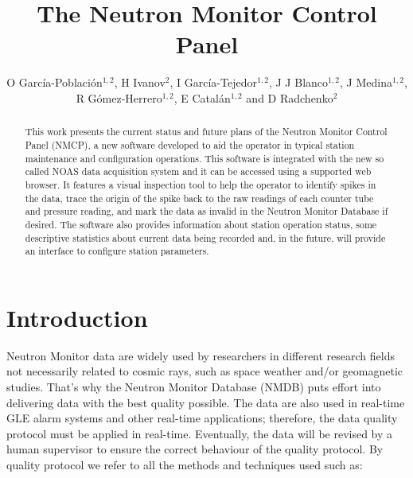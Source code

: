 \documentclass[a4paper]{jpconf}
\begin{document}
\title{The Neutron Monitor Control Panel}

\author{O García-Población$^{1,2}$, H Ivanov$^2$, I García-Tejedor$^{1,2}$,
J J Blanco$^{1,2}$, J Medina$^{1,2}$, R Gómez-Herrero$^{1,2}$, E
Catalán$^{1,2}$ and D Radchenko$^{2}$}

\address{$^1$ Space Research Group, University of Alcalá, Spain}
\address{$^2$ Castilla-La Mancha Neutron Monitor, Parque Tecnológico de Guadalajara, Spain}


\begin{abstract} 

    This work presents the current status and future plans of the Neutron
    Monitor Control Panel (NMCP), a new software developed to aid the operator
    in typical station maintenance and configuration operations. This software
    is integrated with the new so called NOAS data acquisition system and it
    can be accessed using a supported web browser. It features a visual
    inspection tool to help the operator to identify spikes in the data, trace
    the origin of the spike back to the raw readings of each counter tube and
    pressure reading, and mark the data as invalid in the Neutron Monitor
    Database if desired. The software also provides information about station
    operation status, some descriptive statistics about current data being
    recorded and, in the future, will provide an interface to configure station
    parameters.

\end{abstract}

\section{Introduction}

Neutron Monitor data are widely used by researchers in different research
fields not necessarily related to cosmic rays, such as space weather and/or
geomagnetic studies. That's why the Neutron Monitor Database
(NMDB)\cite{NMDB2011} puts effort into delivering data with the best quality
possible. The data are also used in real-time GLE alarm systems and other
real-time applications; therefore, the data quality protocol must be applied in
real-time. Eventually, the data will be revised by a human supervisor to ensure
the correct behaviour of the quality protocol. By quality protocol we refer to
all the methods and techniques used such as:
\end{document}
